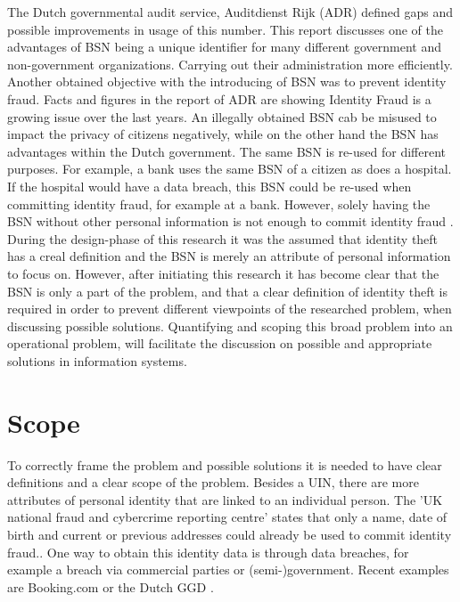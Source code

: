The Dutch governmental audit service, Auditdienst Rijk (ADR) defined gaps and possible improvements in usage of this number\cite{ADR}. This report discusses one of the advantages of BSN being a unique identifier for many different government and non-government organizations. Carrying out their administration more efficiently. Another obtained objective with the introducing of BSN was to prevent identity fraud. Facts and figures in the report of ADR are showing Identity Fraud is a growing issue over the last years. An illegally obtained BSN cab be misused to impact the privacy of citizens negatively, while on the other hand the BSN has advantages within the Dutch government. The same BSN is re-used for different purposes. For example, a bank uses the same BSN of a citizen as does a hospital. If the hospital would have a data breach, this BSN could be re-used when committing identity fraud, for example at a bank. However, solely having the BSN without other personal information is not enough to commit identity fraud . During the design-phase of this research it was the assumed that identity theft has a creal definition and the BSN is merely an attribute of personal information to focus on. However, after initiating this research it has become clear that the BSN is only a part of the problem, and that a clear definition of identity theft is required in order to prevent different viewpoints of the researched problem, when discussing possible solutions. Quantifying and scoping this broad problem into an operational problem, will facilitate the discussion on possible and appropriate solutions in information systems. \par

\section{Scope} \label{scope}
To correctly frame the problem and possible solutions it is needed to have clear definitions and a clear scope of the problem. Besides a UIN, there are more attributes of personal identity that are linked to an individual person. The 'UK national fraud and cybercrime reporting centre' states that only a name, date of birth and current or previous addresses could already be used to commit identity fraud.\cite{Action_fraud}. One way to obtain this identity data is through data breaches, for example a breach via commercial parties or (semi-)government. Recent examples are Booking.com \cite{Booking_databreach} or the Dutch GGD \cite{GGD_databreach}.

